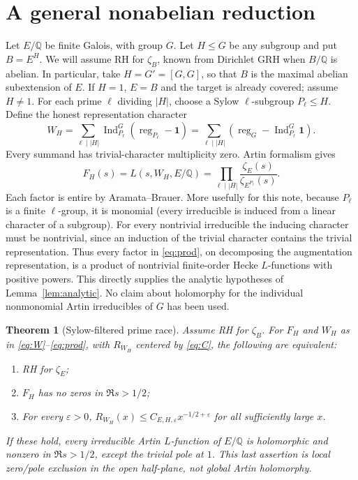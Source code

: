 \documentclass[11pt]{article}
\newtheorem{theorem}{Theorem}
\theoremstyle{remark}\newtheorem{remark}[theorem]{Remark}
\newcommand{\Q}{\mathbb Q}
\newcommand{\Ind}{\operatorname{Ind}}
\newcommand{\Reg}{\operatorname{reg}}
\newcommand{\one}{\mathbf{1}}
\begin{document}
\section{A general nonabelian reduction}\label{sec:sylow}
Let $E/\Q$ be finite Galois, with group $G$. Let $H\le G$ be any subgroup and put $B=E^H$. We will assume RH for $\zeta_B$, known from Dirichlet GRH when $B/\Q$ is abelian. In particular, take $H=G'=[G,G]$, so that $B$ is the maximal abelian subextension of $E$. If $H=1$, $E=B$ and the target is already covered; assume $H\ne1$. For each prime $\ell$ dividing $|H|$, choose a Sylow $\ell$-subgroup $P_\ell\le H$. Define the honest representation character
\begin{equation}\label{eq:W}
 W_H=\sum_{\ell\mid|H|}\Ind_{P_\ell}^G(\Reg_{P_\ell}-\one)
 =\sum_{\ell\mid|H|}(\Reg_G-\Ind_{P_\ell}^G\one).
\end{equation}
Every summand has trivial-character multiplicity zero. Artin formalism gives
\begin{equation}\label{eq:prod}
 F_H(s)=L(s,W_H,E/\Q)=\prod_{\ell\mid|H|}\frac{\zeta_E(s)}{\zeta_{E^{P_\ell}}(s)}.
\end{equation}
Each factor is entire by Aramata--Brauer. More usefully for this note, because $P_\ell$ is a finite $\ell$-group, it is monomial (every irreducible is induced from a linear character of a subgroup). For every nontrivial irreducible the inducing character must be nontrivial, since an induction of the trivial character contains the trivial representation. Thus every factor in \eqref{eq:prod}, on decomposing the augmentation representation, is a product of nontrivial finite-order Hecke $L$-functions with positive powers. This directly supplies the analytic hypotheses of Lemma~\ref{lem:analytic}. No claim about holomorphy for the individual nonmonomial Artin irreducibles of $G$ has been used.

\begin{theorem}[Sylow-filtered prime race]\label{thm:sylow}
Assume RH for $\zeta_B$. For $F_H$ and $W_H$ as in \eqref{eq:W}--\eqref{eq:prod}, with $R_{W_H}$ centered by \eqref{eq:C}, the following are equivalent:
\begin{enumerate}[label=(\roman*)]
\item RH for $\zeta_E$;
\item $F_H$ has no zeros in $\Re s>1/2$;
\item For every $\varepsilon>0$, $R_{W_H}(x)\le C_{E,H,\varepsilon}x^{-1/2+\varepsilon}$ for all sufficiently large $x$.
\end{enumerate}
If these hold, every irreducible Artin $L$-function of $E/\Q$ is holomorphic and nonzero in $\Re s>1/2$, except the trivial pole at $1$. This last assertion is local zero/pole exclusion in the open half-plane, not global Artin holomorphy.
\end{theorem}
\end{document}
